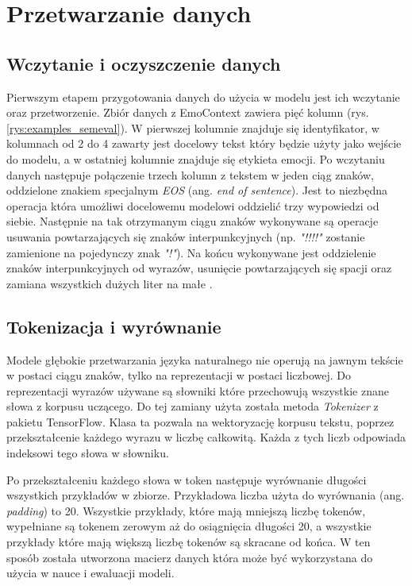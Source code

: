 \chapter{Przetwarzanie danych}
\label{chapter:przetwarzanie_danych}

\section{Wczytanie i oczyszczenie danych}

Pierwszym etapem przygotowania danych do użycia w modelu jest ich wczytanie oraz przetworzenie. Zbiór danych z EmoContext zawiera pięć kolumn (rys. \ref{rys:examples_semeval}). W pierwszej kolumnie znajduje się identyfikator, w kolumnach od 2 do 4 zawarty jest docelowy tekst który będzie użyty jako wejście do modelu, a w ostatniej kolumnie znajduje się etykieta emocji. Po wczytaniu danych następuje połączenie trzech kolumn z tekstem w jeden ciąg znaków, oddzielone znakiem specjalnym \textit{EOS} (ang. \textit{end of sentence}). Jest to niezbędna operacja która umożliwi docelowemu modelowi oddzielić trzy wypowiedzi od siebie. Następnie na tak otrzymanym ciągu znaków wykonywane są operacje usuwania powtarzających się znaków interpunkcyjnych (np. \textit{"!!!!"} zostanie zamienione na pojedynczy znak \textit{"!"}). Na końcu wykonywane jest oddzielenie znaków interpunkcyjnych od wyrazów, usunięcie powtarzających się spacji oraz zamiana wszystkich dużych liter na małe .

\section{Tokenizacja i wyrównanie}

Modele głębokie przetwarzania języka naturalnego nie operują na jawnym tekście w postaci ciągu znaków, tylko na reprezentacji w postaci liczbowej. Do reprezentacji wyrazów używane są słowniki które przechowują wszystkie znane słowa z korpusu uczącego. Do tej zamiany użyta została metoda \textit{Tokenizer} z pakietu TensorFlow. Klasa ta pozwala na wektoryzację korpusu tekstu, poprzez przekształcenie każdego wyrazu w liczbę całkowitą. Każda z tych liczb odpowiada indeksowi tego słowa w słowniku.

Po przekształceniu każdego słowa w token następuje wyrównanie długości wszystkich przykładów w zbiorze. Przykładowa liczba użyta do wyrównania (ang. \textit{padding}) to 20. Wszystkie przykłady, które mają mniejszą liczbę tokenów, wypełniane są tokenem zerowym aż do osiągnięcia długości 20, a wszystkie przykłady które mają większą liczbę tokenów są skracane od końca. W ten sposób została utworzona macierz danych która może być wykorzystana do użycia w nauce i ewaluacji modeli.

